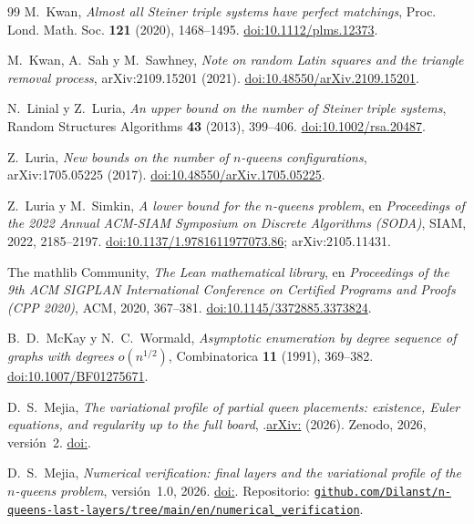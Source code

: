 \begin{thebibliography}{99}
 M.~Kwan, \emph{Almost all Steiner triple systems have perfect matchings},
Proc. Lond. Math. Soc. \textbf{121} (2020), 1468--1495.
\href{https://doi.org/10.1112/plms.12373}{doi:10.1112/plms.12373}.

 M.~Kwan, A.~Sah y M.~Sawhney, \emph{Note on random Latin squares and the triangle
removal process}, arXiv:2109.15201 (2021).
\href{https://doi.org/10.48550/arXiv.2109.15201}{doi:10.48550/arXiv.2109.15201}.

 N.~Linial y Z.~Luria, \emph{An upper bound on the number of Steiner triple
systems}, Random Structures Algorithms \textbf{43} (2013), 399--406.
\href{https://doi.org/10.1002/rsa.20487}{doi:10.1002/rsa.20487}.

 Z.~Luria, \emph{New bounds on the number of $n$-queens configurations},
arXiv:1705.05225 (2017).
\href{https://doi.org/10.48550/arXiv.1705.05225}{doi:10.48550/arXiv.1705.05225}.

 Z.~Luria y M.~Simkin, \emph{A lower bound for the $n$-queens problem}, en
\emph{Proceedings of the 2022 Annual ACM-SIAM Symposium on Discrete Algorithms (SODA)}, SIAM, 2022,
2185--2197.
\href{https://doi.org/10.1137/1.9781611977073.86}{doi:10.1137/1.9781611977073.86};
arXiv:2105.11431.

\ifverificacionLean
{} The mathlib Community, \emph{The Lean mathematical library}, en
\emph{Proceedings of the 9th ACM SIGPLAN International Conference on Certified Programs and Proofs
(CPP 2020)}, ACM, 2020, 367--381.
\href{https://doi.org/10.1145/3372885.3373824}{doi:10.1145/3372885.3373824}.
\fi

 B.~D.~McKay y N.~C.~Wormald, \emph{Asymptotic enumeration by degree sequence
of graphs with degrees $o(n^{1/2})$}, Combinatorica \textbf{11} (1991), 369--382.
\href{https://doi.org/10.1007/BF01275671}{doi:10.1007/BF01275671}.

 D.~S.~Mejia, \emph{The variational profile of partial queen placements: existence,
Euler equations, and regularity up to the full board},
\ifx\DOIPerfil\empty
\ifx\arXivPerfil{}.\else\href{https://arxiv.org/abs/\arXivPerfil}{arXiv:\arXivPerfil} (2026).\fi
\else Zenodo, 2026, versión~2. \href{https://doi.org/\DOIPerfil}{doi:\DOIPerfil}.\fi

 D.~S.~Mejia, \emph{Numerical verification: final layers and the variational profile of the
$n$-queens problem}, versión~1.0, 2026.
\ifx\DOIcodigo\empty\else\href{https://doi.org/\DOIcodigo}{doi:\DOIcodigo}. \fi
Repositorio:
\href{https://github.com/Dilanst/n-queens-last-layers/tree/main/en/numerical_verification}%
{\nolinkurl{github.com/Dilanst/n-queens-last-layers/tree/main/en/numerical_verification}}.


\end{thebibliography}

